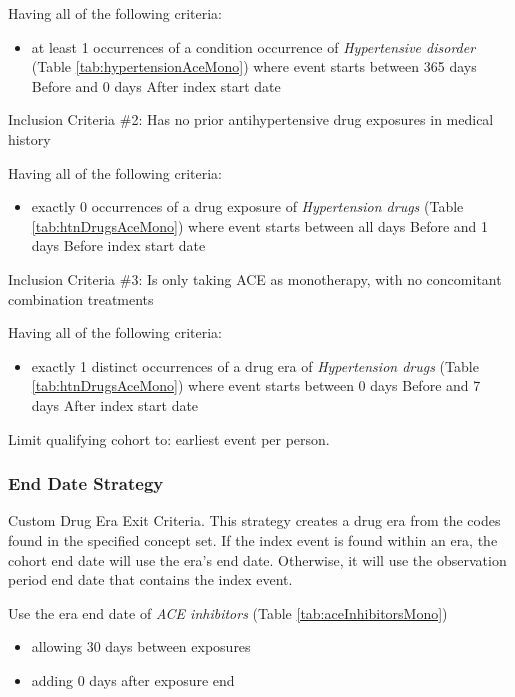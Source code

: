 \documentclass[10.5pt]{book}
\providecommand{\tightlist}{%
  \setlength{\itemsep}{0pt}\setlength{\parskip}{0pt}}
\theoremstyle{definition}
\theoremstyle{definition}
\theoremstyle{definition}
\theoremstyle{remark}
\begin{document}
Having all of the following criteria:

\begin{itemize}
\tightlist
\item
  at least 1 occurrences of a condition occurrence of \emph{Hypertensive
  disorder} (Table \ref{tab:hypertensionAceMono}) where event starts
  between 365 days Before and 0 days After index start date
\end{itemize}

Inclusion Criteria \#2: Has no prior antihypertensive drug exposures in
medical history

Having all of the following criteria:

\begin{itemize}
\tightlist
\item
  exactly 0 occurrences of a drug exposure of \emph{Hypertension drugs}
  (Table \ref{tab:htnDrugsAceMono}) where event starts between all days
  Before and 1 days Before index start date
\end{itemize}

Inclusion Criteria \#3: Is only taking ACE as monotherapy, with no
concomitant combination treatments

Having all of the following criteria:

\begin{itemize}
\tightlist
\item
  exactly 1 distinct occurrences of a drug era of \emph{Hypertension
  drugs} (Table \ref{tab:htnDrugsAceMono}) where event starts between 0
  days Before and 7 days After index start date
\end{itemize}

Limit qualifying cohort to: earliest event per person.

\subsubsection*{End Date Strategy}\label{end-date-strategy-1}

Custom Drug Era Exit Criteria. This strategy creates a drug era from the
codes found in the specified concept set. If the index event is found
within an era, the cohort end date will use the era's end date.
Otherwise, it will use the observation period end date that contains the
index event.

Use the era end date of \emph{ACE inhibitors} (Table
\ref{tab:aceInhibitorsMono})

\begin{itemize}
\tightlist
\item
  allowing 30 days between exposures
\item
  adding 0 days after exposure end
\end{itemize}
\end{document}
